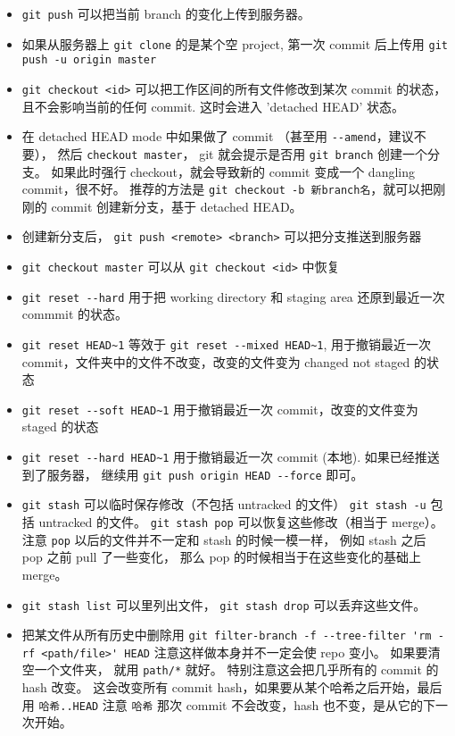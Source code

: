 \begin{itemize}
\item \verb`git push` 可以把当前 branch 的变化上传到服务器。
\item 如果从服务器上 \verb`git clone` 的是某个空 project, 第一次 commit 后上传用 \verb`git push -u origin master`
\item \verb`git checkout <id>` 可以把工作区间的所有文件修改到某次 commit 的状态， 且不会影响当前的任何 commit. 这时会进入 'detached HEAD' 状态。
\item 在 detached HEAD mode 中如果做了 commit （甚至用 \verb`--amend`，建议不要）， 然后 \verb`checkout master`， git 就会提示是否用 \verb`git branch` 创建一个分支。 如果此时强行 checkout，就会导致新的 commit 变成一个 dangling commit，很不好。 推荐的方法是 \verb`git checkout -b 新branch名`，就可以把刚刚的 commit 创建新分支，基于 detached HEAD。
\item 创建新分支后， \verb`git push <remote> <branch>` 可以把分支推送到服务器
\item \verb`git checkout master` 可以从 \verb`git checkout <id>` 中恢复
\item \verb`git reset --hard` 用于把 working directory 和 staging area 还原到最近一次 commmit 的状态。
\item \verb`git reset HEAD~1` 等效于 \verb`git reset --mixed HEAD~1`, 用于撤销最近一次 commit，文件夹中的文件不改变，改变的文件变为 changed not staged 的状态
\item \verb`git reset --soft HEAD~1` 用于撤销最近一次 commit，改变的文件变为 staged 的状态
\item \verb`git reset --hard HEAD~1` 用于撤销最近一次 commit (本地). 如果已经推送到了服务器， 继续用 \verb`git push origin HEAD --force` 即可。
\item \verb`git stash` 可以临时保存修改（不包括 untracked 的文件） \verb`git stash -u` 包括 untracked 的文件。 \verb`git stash pop` 可以恢复这些修改（相当于 merge）。 注意 \verb`pop` 以后的文件并不一定和 stash 的时候一模一样， 例如 stash 之后 pop 之前 pull 了一些变化， 那么 pop 的时候相当于在这些变化的基础上 merge。
\item \verb`git stash list` 可以里列出文件， \verb`git stash drop` 可以丢弃这些文件。
\item 把某文件从所有历史中删除用 \verb`git filter-branch -f --tree-filter 'rm -rf <path/file>' HEAD` 注意这样做本身并不一定会使 repo 变小。 如果要清空一个文件夹， 就用 \verb`path/*` 就好。 特别注意这会把几乎所有的 commit 的 hash 改变。 这会改变所有 commit hash，如果要从某个哈希之后开始，最后用 \verb`哈希..HEAD` 注意 \verb`哈希` 那次 commit 不会改变，hash 也不变，是从它的下一次开始。

\end{itemize}
